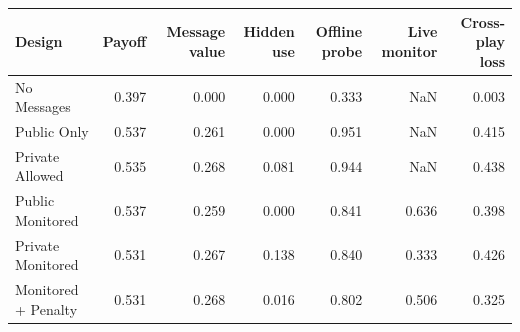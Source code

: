 \begin{tabular}{lrrrrrr}
\toprule
Design & Payoff & Message value & Hidden use & Offline probe & Live monitor & Cross-play loss \\
\midrule
No Messages & 0.397 & 0.000 & 0.000 & 0.333 & NaN & 0.003 \\
Public Only & 0.537 & 0.261 & 0.000 & 0.951 & NaN & 0.415 \\
Private Allowed & 0.535 & 0.268 & 0.081 & 0.944 & NaN & 0.438 \\
Public Monitored & 0.537 & 0.259 & 0.000 & 0.841 & 0.636 & 0.398 \\
Private Monitored & 0.531 & 0.267 & 0.138 & 0.840 & 0.333 & 0.426 \\
Monitored + Penalty & 0.531 & 0.268 & 0.016 & 0.802 & 0.506 & 0.325 \\
\bottomrule
\end{tabular}
